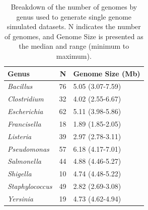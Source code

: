 \documentclass[fleqn,10pt,lineno]{wlpeerj}\usepackage[]{graphicx}\usepackage[]{color}
\begin{document}
\begin{table}[ht]
\centering
\begin{tabular}{lrl}
  \hline
Genus & N & Genome Size (Mb) \\ 
  \hline
\textit{Bacillus} &  76 & 5.05 (3.07-7.59) \\ 
  \textit{Clostridium} &  32 & 4.02 (2.55-6.67) \\ 
  \textit{Escherichia} &  62 & 5.11 (3.98-5.86) \\ 
  \textit{Francisella} &  18 & 1.89 (1.85-2.05) \\ 
  \textit{Listeria} &  39 & 2.97 (2.78-3.11) \\ 
  \textit{Pseudomonas} &  57 & 6.18 (4.17-7.01) \\ 
  \textit{Salmonella} &  44 & 4.88 (4.46-5.27) \\ 
  \textit{Shigella} &  10 & 4.74 (4.48-5.22) \\ 
  \textit{Staphylococcus} &  49 & 2.82 (2.69-3.08) \\ 
  \textit{Yersinia} &  19 & 4.73 (4.62-4.94) \\ 
   \hline
\end{tabular}
\caption{Breakdown of the number of genomes by genus used to generate single genome simulated datasets. N indicates the number of genomes, and Genome Size is presented as the median and range (minimum to maximum).} 
\label{tab:single_org}
\end{table}
\end{document}

